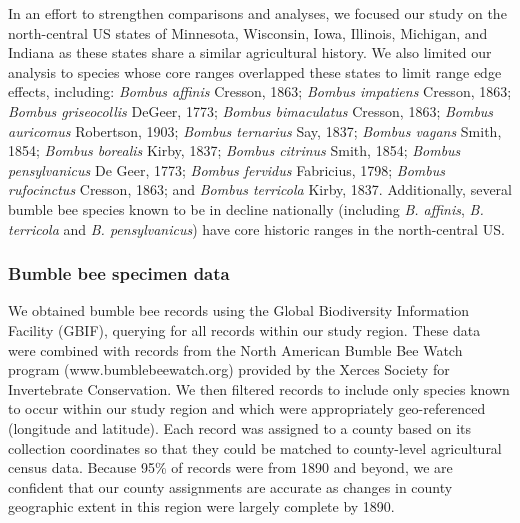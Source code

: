 \documentclass[11pt,]{article}
\begin{document}
In an effort to strengthen comparisons and analyses, we focused our
study on the north-central US states of Minnesota, Wisconsin, Iowa,
Illinois, Michigan, and Indiana as these states share a similar
agricultural history. We also limited our analysis to species whose core
ranges overlapped these states to limit range edge effects, including:
\emph{Bombus affinis} Cresson, 1863; \emph{Bombus impatiens} Cresson,
1863; \emph{Bombus griseocollis} DeGeer, 1773; \emph{Bombus bimaculatus}
Cresson, 1863; \emph{Bombus auricomus} Robertson, 1903; \emph{Bombus
ternarius} Say, 1837; \emph{Bombus vagans} Smith, 1854; \emph{Bombus
borealis} Kirby, 1837; \emph{Bombus citrinus} Smith, 1854; \emph{Bombus
pensylvanicus} De Geer, 1773; \emph{Bombus fervidus} Fabricius, 1798;
\emph{Bombus rufocinctus} Cresson, 1863; and \emph{Bombus terricola}
Kirby, 1837. Additionally, several bumble bee species known to be in
decline nationally (including \emph{B. affinis}, \emph{B. terricola} and
\emph{B. pensylvanicus}) have core historic ranges in the north-central
US.

\hypertarget{bumble-bee-specimen-data}{%
\subsubsection{Bumble bee specimen
data}\label{bumble-bee-specimen-data}}

We obtained bumble bee records using the Global Biodiversity Information
Facility (GBIF), querying for all records within our study region. These
data were combined with records from the North American Bumble Bee Watch
program (www.bumblebeewatch.org) provided by the Xerces Society for
Invertebrate Conservation. We then filtered records to include only
species known to occur within our study region and which were
appropriately geo-referenced (longitude and latitude). Each record was
assigned to a county based on its collection coordinates so that they
could be matched to county-level agricultural census data. Because 95\%
of records were from 1890 and beyond, we are confident that our county
assignments are accurate as changes in county geographic extent in this
region were largely complete by 1890.
\end{document}
